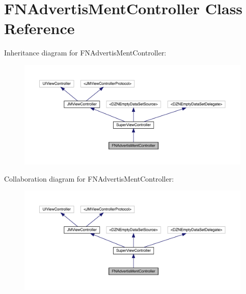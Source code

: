 \hypertarget{interface_f_n_advertis_ment_controller}{}\section{F\+N\+Advertis\+Ment\+Controller Class Reference}
\label{interface_f_n_advertis_ment_controller}


Inheritance diagram for F\+N\+Advertis\+Ment\+Controller\+:\nopagebreak
\begin{figure}[H]
\begin{center}
\leavevmode
\includegraphics[width=350pt]{interface_f_n_advertis_ment_controller__inherit__graph}
\end{center}
\end{figure}


Collaboration diagram for F\+N\+Advertis\+Ment\+Controller\+:\nopagebreak
\begin{figure}[H]
\begin{center}
\leavevmode
\includegraphics[width=350pt]{interface_f_n_advertis_ment_controller__coll__graph}
\end{center}
\end{figure}
